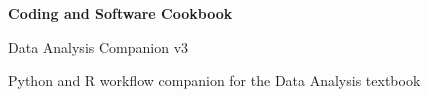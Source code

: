 \documentclass[11pt,oneside]{book}
\begin{document}
\frontmatter
\begin{titlepage}
  \centering
  \vspace*{2.5in}
  {\Huge\bfseries Coding and Software Cookbook\par}
  \vspace{1em}
  {\Large Data Analysis Companion v3\par}
  \vfill
  {\large Python and R workflow companion for the Data Analysis textbook\par}
  \thispagestyle{empty}
\end{titlepage}
\tableofcontents
\clearpage

\mainmatter

\end{document}
